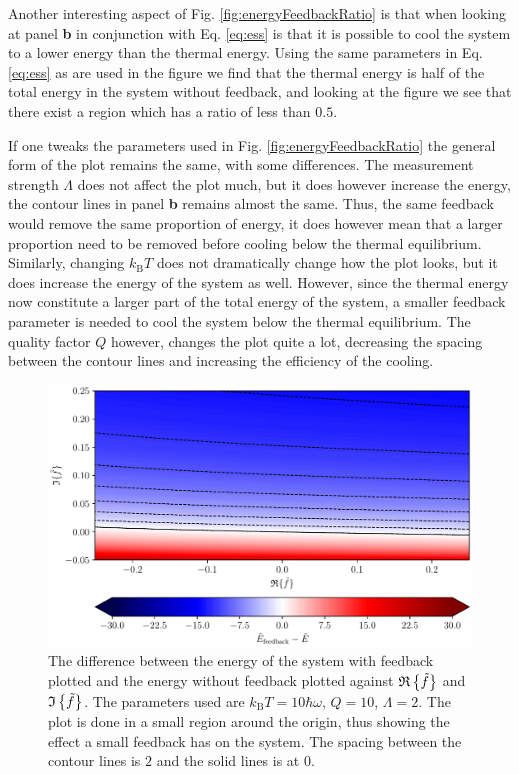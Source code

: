 Another interesting aspect of Fig. \ref{fig:energyFeedbackRatio} is that when looking at panel \textbf{b} in conjunction with Eq. \eqref{eq:ess} is that it is possible to cool the system to a lower energy than the thermal energy. Using the same parameters in Eq. \eqref{eq:ess} as are used in the figure we find that the thermal energy is half of the total energy in the system without feedback, and looking at the figure we see that there exist a region which has a ratio of less than $0.5$.

If one tweaks the parameters used in Fig. \ref{fig:energyFeedbackRatio} the general form of the plot remains the same, with some differences. The measurement strength $\Lambda$ does not affect the plot much, but it does however increase the energy, the contour lines in panel \textbf{b} remains almost the same. Thus, the same feedback would remove the same proportion of energy, it does however mean that a larger proportion need to be removed before cooling below the thermal equilibrium. Similarly, changing $k_\text{B}T$ does not dramatically change how the plot looks, but it does increase the energy of the system as well. However, since the thermal energy now constitute a larger part of the total energy of the system, a smaller feedback parameter is needed to cool the system below the thermal equilibrium. The quality factor $Q$ however, changes the plot quite a lot, decreasing the spacing between the contour lines and increasing the efficiency of the cooling.

\begin{figure}[t]
    \centering
    \includegraphics[width=\textwidth]{figures/energyFeedbackDifference.pdf}
    \caption{\small The difference between the energy of the system with feedback plotted and the energy without feedback plotted against $\mathfrak{R}\left\{\tilde{f}\right\}$ and $\mathfrak{I}\left\{\tilde{f}\right\}$. The parameters used are $k_\text{B}T = 10 \hbar\omega$, $Q = 10$, $\Lambda = 2$. The plot is done in a small region around the origin, thus showing the effect a small feedback has on the system. The spacing between the contour lines is $2$ and the solid lines is at $0$.}
    \label{fig:energyFeedbackDifference}
\end{figure}

